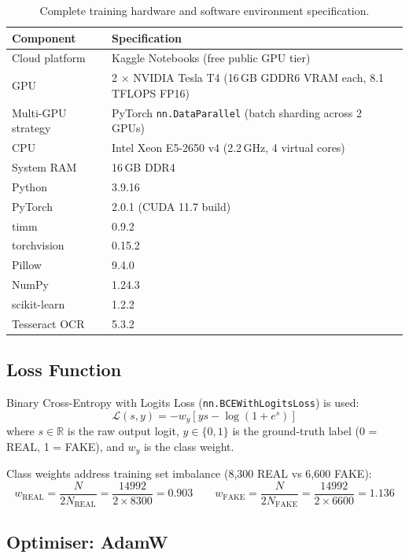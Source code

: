 \documentclass[12pt,a4paper,oneside]{report}
\begin{document}
\begin{table}[H]
\centering
\caption{Complete training hardware and software environment specification.}
\label{tab:env_full}
\renewcommand{\arraystretch}{1.3}
\begin{tabularx}{\textwidth}{lX}
\toprule
\textbf{Component} & \textbf{Specification} \\
\midrule
Cloud platform         & Kaggle Notebooks (free public GPU tier) \\
GPU                    & 2 $\times$ NVIDIA Tesla T4 (16\,GB GDDR6 VRAM each, 8.1 TFLOPS FP16) \\
Multi-GPU strategy     & PyTorch \texttt{nn.DataParallel} (batch sharding across 2 GPUs) \\
CPU                    & Intel Xeon E5-2650 v4 (2.2\,GHz, 4 virtual cores) \\
System RAM             & 16\,GB DDR4 \\
Python                 & 3.9.16 \\
PyTorch                & 2.0.1 (CUDA 11.7 build) \\
timm                   & 0.9.2 \\
torchvision            & 0.15.2 \\
Pillow                 & 9.4.0 \\
NumPy                  & 1.24.3 \\
scikit-learn           & 1.2.2 \\
Tesseract OCR          & 5.3.2 \\
\bottomrule
\end{tabularx}
\end{table}

\subsection{Loss Function}

Binary Cross-Entropy with Logits Loss (\texttt{nn.BCEWithLogitsLoss}) is used:
\[
  \mathcal{L}(s, y) = -w_y\!\left[ys - \log(1 + e^s)\right]
\]
where $s \in \mathbb{R}$ is the raw output logit, $y \in \{0, 1\}$ is the
ground-truth label (0 = REAL, 1 = FAKE), and $w_y$ is the class weight.

Class weights address training set imbalance (8,300 REAL vs 6,600 FAKE):
\[
  w_{\text{REAL}} = \frac{N}{2 N_{\text{REAL}}} = \frac{14992}{2 \times 8300} = 0.903
  \qquad
  w_{\text{FAKE}} = \frac{N}{2 N_{\text{FAKE}}} = \frac{14992}{2 \times 6600} = 1.136
\]

\subsection{Optimiser: AdamW}
\end{document}
